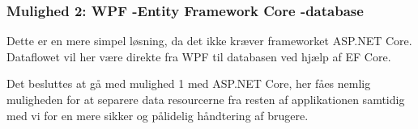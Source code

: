 \subsubsection{Mulighed 2: WPF -\g Entity Framework Core -\g database}
Dette er en mere simpel løsning, da det ikke kræver frameworket ASP.NET Core. Dataflowet vil her være direkte fra WPF til databasen ved hjælp af EF Core. 

Det besluttes at gå med mulighed 1 med ASP.NET Core, her fåes nemlig muligheden for at separere data resourcerne fra resten af applikationen samtidig med vi for en mere sikker og pålidelig håndtering af brugere.






